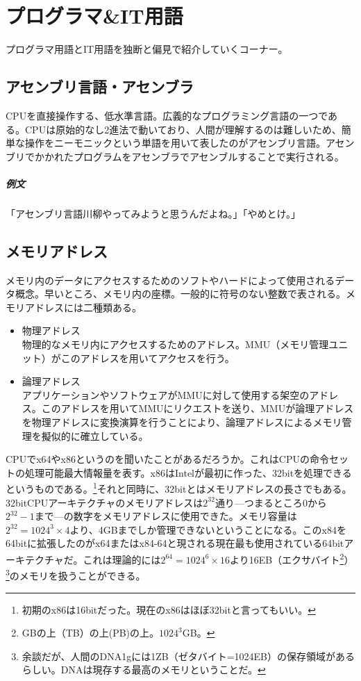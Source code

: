 \documentclass[a4paper]{ltjsreport}
\begin{document}
\newpage
\section{プログラマ\&IT用語}
プログラマ用語とIT用語を独断と偏見で紹介していくコーナー。

\subsection{アセンブリ言語・アセンブラ}
CPUを直接操作する、低水準言語。広義的なプログラミング言語の一つである。CPUは原始的なし2進法で動いており、人間が理解するのは難しいため、簡単な操作をニーモニックという単語を用いて表したのがアセンブリ言語。アセンブリでかかれたプログラムをアセンブラでアセンブルすることで実行される。

\subparagraph{例文} 「アセンブリ言語川柳やってみようと思うんだよね。」「やめとけ。」

\subsection{メモリアドレス}
メモリ内のデータにアクセスするためのソフトやハードによって使用されるデータ概念。早いところ、メモリ内の座標。一般的に符号のない整数で表される。メモリアドレスには二種類ある。

\begin{itemize}
  \item 物理アドレス\\
        物理的なメモリ内にアクセスするためのアドレス。MMU（メモリ管理ユニット）がこのアドレスを用いてアクセスを行う。

  \item 論理アドレス\\
        アプリケーションやソフトウェアがMMUに対して使用する架空のアドレス。このアドレスを用いてMMUにリクエストを送り、MMUが論理アドレスを物理アドレスに変換演算を行うことにより、論理アドレスによるメモリ管理を擬似的に確立している。
\end{itemize}

CPUでx64やx86というのを聞いたことがあるだろうか。これはCPUの命令セットの処理可能最大情報量を表す。x86はIntelが最初に作った、32bitを処理できるというものである。\footnote{初期のx86は16bitだった。現在のx86はほぼ32bitと言ってもいい。}それと同時に、32bitとはメモリアドレスの長さでもある。32bitCPUアーキテクチャのメモリアドレスは$2^{32}$通り---つまるところ$0$から$2^{32}-1$まで---の数字をメモリアドレスに使用できた。メモリ容量は$2^{32} = 1024^3\times4$より、4GBまでしか管理できないということになる。このx84を64bitに拡張したのがx64またはx84-64と現される現在最も使用されている64bitアーキテクチャだ。これは理論的には$2^{64} = 1024^6\times16$より16EB（エクサバイト\footnote{GBの上（TB）の上(PB)の上。$1024^3$GB。}）\footnote{余談だが、人間のDNA1gには1ZB（ゼタバイト=1024EB）の保存領域があるらしい。DNAは現存する最高のメモリということだ。}のメモリを扱うことができる。
\end{document}
